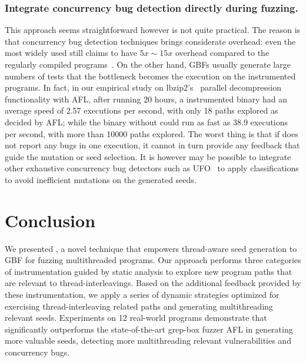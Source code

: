 \subsubsection{Integrate concurrency bug detection directly during fuzzing.}\label{sec:discuss_ts_cbugs}
This approach seems straightforward however is not quite practical. The reason is that concurrency bug detection techniques brings considerate overhead: even the most widely used \ts still claims to have $5x\sim 15x$ overhead compared to the regularly compiled programs~\cite{kcc:tsan,lwn_tsan}. On the other hand, GBFs usually generate large numbers of tests that the bottleneck becomes the execution on the \ts instrumented programs. In fact, in our empirical study on lbzip2's~\cite{lbzip2} parallel decompression functionality with AFL, after running 20 hours, a \ts instrumented binary had an average speed of 2.57 executions per second, with only 18 paths explored as decided by AFL; while the binary without \ts could run as fast as 38.9 executions per second, with more than 10000 paths explored. The worst thing is that if \ts does not report any bugs in one execution, it cannot in turn provide any feedback that guide the mutation or seed selection. It is however may be possible to integrate other exhaustive concurrency bug detectors such as UFO~\cite{icse18_ufo} to apply classifications to avoid inefficient mutations on the generated seeds.






\section{Conclusion}
We presented \mtfuzz, a novel technique that empowers thread-aware seed generation to GBF
for fuzzing multithreaded programs. Our approach performs three categories of instrumentation guided by static analysis to explore new program paths that are relevant to thread-interleavings. Based on the additional feedback provided by these instrumentation, we apply a series of dynamic strategies optimized for exercising thread-interleaving related paths and generating multithreading relevant seeds. 
Experiments on 12 real-world programs demonstrate that \mtfuzz significantly outperforms the state-of-the-art grep-box fuzzer AFL in generating more valuable seeds, detecting more multithreading relevant vulnerabilities and concurrency bugs.

